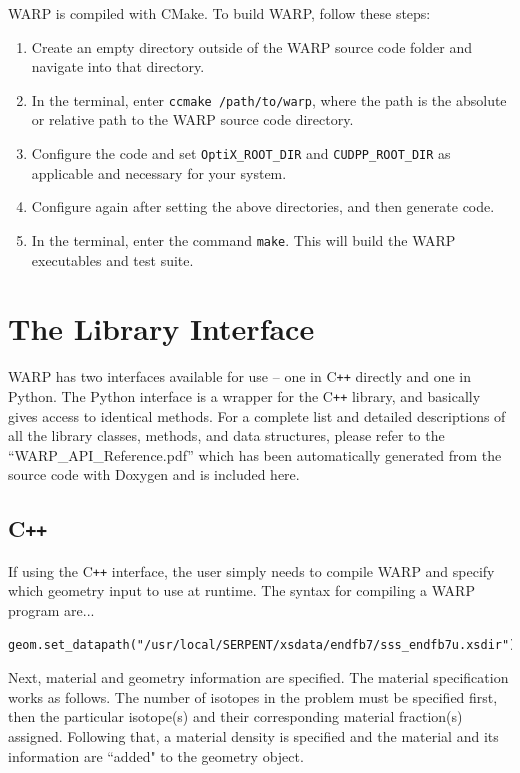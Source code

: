 \documentclass[twoside,a4paper]{refart}
\begin{document}
WARP is compiled with CMake. To build WARP, follow these steps:

\begin{enumerate}
\item{Create an empty directory outside of the WARP source code folder and navigate into that directory.}
\item{In the terminal, enter \texttt{ccmake /path/to/warp}, where the path is the absolute or relative 
path to the WARP source code directory.}
\item{Configure the code and set \texttt{OptiX\_ROOT\_DIR} and \texttt{CUDPP\_ROOT\_DIR} as applicable
and necessary for your system.}
\item{Configure again after setting the above directories, and then generate code.}
\item{In the terminal, enter the command \texttt{make}. This will build the WARP executables and test 
suite.}
\end{enumerate}

\section{The Library Interface}

WARP has two interfaces available for use -- one in C\texttt{++} directly and one in Python.  The Python 
interface is a wrapper for the C\texttt{++} library, and basically gives access to identical methods.  For
a complete list and detailed descriptions of all the library classes, methods, and data structures, please
refer to the ``WARP\_API\_Reference.pdf'' which has been automatically generated from the source code with
Doxygen and is included here.

\subsection{C\texttt{++}}

If using the C\texttt{++} interface, the user simply needs to compile WARP and specify which geometry
input to use at runtime. The syntax for compiling a WARP program are...

\begin{verbatim}
geom.set_datapath("/usr/local/SERPENT/xsdata/endfb7/sss_endfb7u.xsdir");
\end{verbatim}

Next, material and geometry information are specified. The material specification works as follows. The 
number of isotopes in the problem must be specified first, then the particular isotope(s) and their 
corresponding material fraction(s) assigned. Following that, a material density is specified and the 
material and its information are ``added" to the geometry object.
\end{document}
